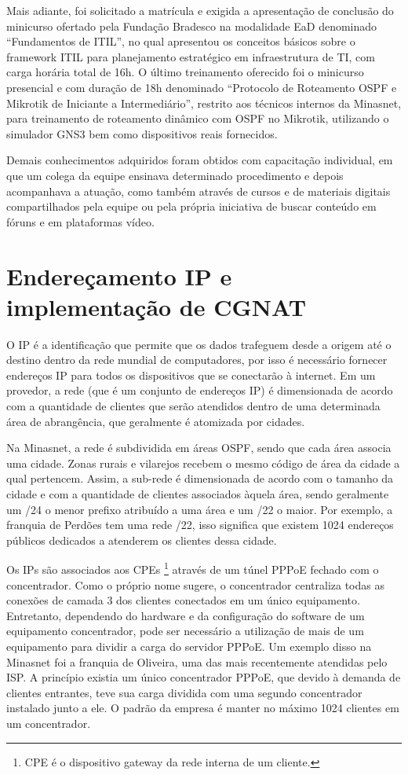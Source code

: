     Mais adiante, foi solicitado a matrícula e exigida a apresentação de conclusão do minicurso ofertado pela Fundação Bradesco na modalidade EaD denominado ``Fundamentos de ITIL'', no qual apresentou os conceitos básicos sobre o framework ITIL para planejamento estratégico em infraestrutura de TI, com carga horária total de 16h. O último treinamento oferecido foi o minicurso presencial e com duração de 18h denominado ``Protocolo de Roteamento OSPF e Mikrotik de Iniciante a Intermediário'', restrito aos técnicos internos da Minasnet, para treinamento de roteamento dinâmico com OSPF no Mikrotik, utilizando o simulador GNS3 bem como dispositivos reais fornecidos.
    
    Demais conhecimentos adquiridos foram obtidos com capacitação individual, em que um colega da equipe ensinava determinado procedimento e depois acompanhava a atuação, como também através de cursos e de materiais digitais compartilhados pela equipe ou pela própria iniciativa de buscar conteúdo em fóruns e em plataformas vídeo.
    
\section{Endereçamento IP e implementação de CGNAT}

    O IP é a identificação que permite que os dados trafeguem desde a origem até o destino dentro da rede mundial de computadores, por isso é necessário fornecer endereços IP para todos os dispositivos que se conectarão à internet. Em um provedor, a rede (que é um conjunto de endereços IP) é dimensionada de acordo com a quantidade de clientes que serão atendidos dentro de uma determinada área de abrangência, que geralmente é atomizada por cidades.
    
    Na Minasnet, a rede é subdividida em áreas OSPF, sendo que cada área associa uma cidade. Zonas rurais e vilarejos recebem o mesmo código de área da cidade a qual pertencem. Assim, a sub-rede é dimensionada de acordo com o tamanho da cidade e com a quantidade de clientes associados àquela área, sendo geralmente um /24 o menor prefixo atribuído a uma área e um /22 o maior. Por exemplo, a franquia de Perdões tem uma rede /22, isso significa que existem 1024 endereços públicos dedicados a atenderem os clientes dessa cidade.
    
   Os IPs são associados aos CPEs \footnote{CPE é o dispositivo gateway da rede interna de um cliente.} através de um túnel PPPoE fechado com o concentrador. Como o próprio nome sugere, o concentrador centraliza todas as conexões de camada 3 dos clientes conectados em um único equipamento. Entretanto, dependendo do hardware e da configuração do software de um equipamento concentrador, pode ser necessário a utilização de mais de um equipamento para dividir a carga do servidor PPPoE. 
   Um exemplo disso na Minasnet foi a franquia de Oliveira, uma das mais recentemente atendidas pelo ISP. A princípio existia um único concentrador PPPoE, que devido à demanda de clientes entrantes, teve sua carga dividida com uma segundo concentrador instalado junto a ele. O padrão da empresa é manter no máximo 1024 clientes em um concentrador.
   
